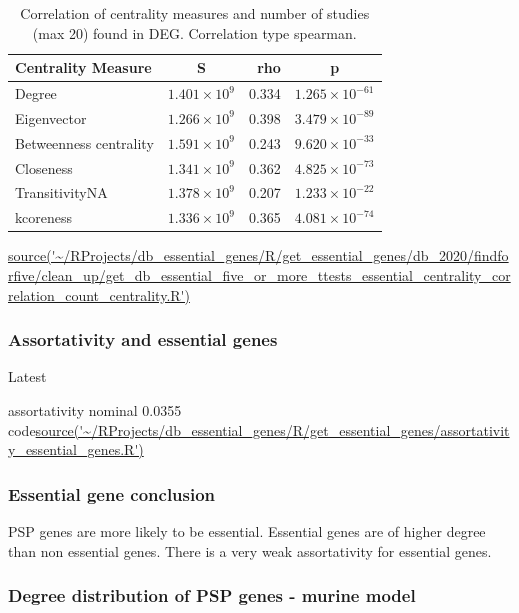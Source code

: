 \begin{table}[ht]
\centering
\begin{tabular}{lcrc}
  \toprule
Centrality Measure & S & rho & p \\ 
  \midrule
 Degree  & $1.401 \times 10^{9}$ & 0.334 & $1.265 \times 10^{-61}$ \\ 
 Eigenvector   & $1.266 \times 10^{9}$ & 0.398 & $3.479 \times 10^{-89}$ \\ 
 Betweenness centrality   & $1.591 \times 10^{9}$ & 0.243 & $9.620 \times 10^{-33}$ \\ 
   Closeness   & $1.341 \times 10^{9}$ & 0.362 & $4.825 \times 10^{-73}$ \\ 
  TransitivityNA   & $1.378 \times 10^{9}$ & 0.207 & $1.233 \times 10^{-22}$ \\ 
  kcoreness   & $1.336 \times 10^{9}$ & 0.365 & $4.081 \times 10^{-74}$ \\ 
   \bottomrule
\end{tabular}
\caption{Correlation of centrality measures and number of studies (max 20) found in DEG. Correlation type spearman.}
\tiny\url{source('~/RProjects/db_essential_genes/R/get_essential_genes/db_2020/findforfive/clean_up/get_db_essential_five_or_more_ttests_essential_centrality_correlation_count_centrality.R')}
\label{tab:Correlation centrality and num studies DEG}
\end{table}
\subsubsection{Assortativity and essential genes}
\label{sec:Assortativity and essential genes}
Latest 

assortativity nominal 0.0355
code\url{source('~/RProjects/db_essential_genes/R/get_essential_genes/assortativity_essential_genes.R')}

\subsubsection{Essential gene conclusion}
PSP genes are more likely to be essential. Essential genes are of higher degree than non essential genes. There is a very weak assortativity for essential genes. 


 \subsubsection{Degree distribution of PSP genes - murine model}
 
